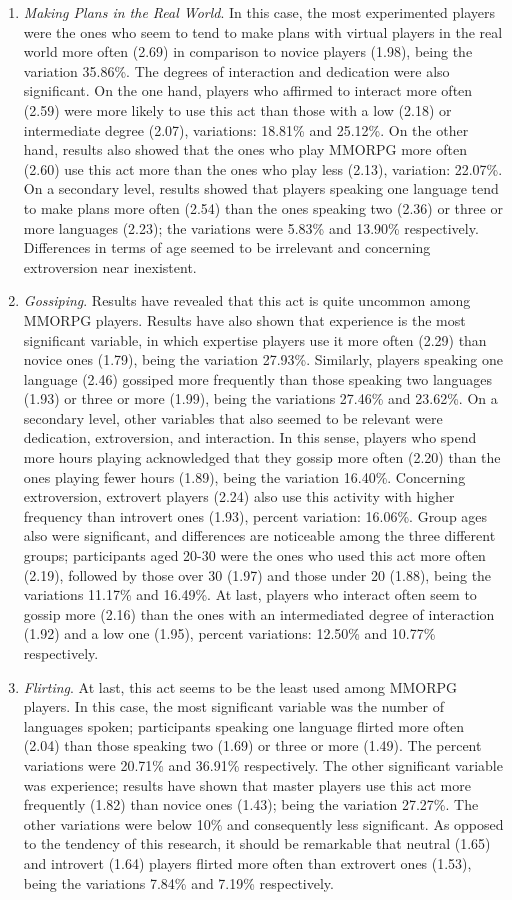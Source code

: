 \documentclass[english]{textolivre}
\begin{document}
\begin{enumerate}
\item \emph{Making Plans in the Real World}. In this case, the most experimented players were the ones who seem to tend to make plans with virtual players in the real world more often (2.69) in comparison to novice players (1.98), being the variation 35.86\%. The degrees of interaction and dedication were also significant. On the one hand, players who affirmed to interact more often (2.59) were more likely to use this act than those with a low (2.18) or intermediate degree (2.07), variations: 18.81\% and 25.12\%. On the other hand, results also showed that the ones who play MMORPG more often (2.60) use this act more than the ones who play less (2.13), variation: 22.07\%. On a secondary level, results showed that players speaking one language tend to make plans more often (2.54) than the ones speaking two (2.36) or three or more languages (2.23); the variations were 5.83\% and 13.90\% respectively. Differences in terms of age seemed to be irrelevant and concerning extroversion near inexistent. 
\item \emph{Gossiping}. Results have revealed that this act is quite uncommon among MMORPG players. Results have also shown that experience is the most significant variable, in which expertise players use it more often (2.29) than novice ones (1.79), being the variation 27.93\%. Similarly, players speaking one language (2.46) gossiped more frequently than those speaking two languages (1.93) or three or more (1.99), being the variations 27.46\% and 23.62\%. On a secondary level, other variables that also seemed to be relevant were dedication, extroversion, and interaction. In this sense, players who spend more hours playing acknowledged that they gossip more often (2.20) than the ones playing fewer hours (1.89), being the variation 16.40\%. Concerning extroversion, extrovert players (2.24) also use this activity with higher frequency than introvert ones (1.93), percent variation: 16.06\%. Group ages also were significant, and differences are noticeable among the three different groups; participants aged 20-30 were the ones who used this act more often (2.19), followed by those over 30 (1.97) and those under 20 (1.88), being the variations 11.17\% and 16.49\%. At last, players who interact often seem to gossip more (2.16) than the ones with an intermediated degree of interaction (1.92) and a low one (1.95), percent variations: 12.50\% and 10.77\% respectively.
\item \emph{Flirting}. At last, this act seems to be the least used among MMORPG players. In this case, the most significant variable was the number of languages spoken; participants speaking one language flirted more often (2.04) than those speaking two (1.69) or three or more (1.49). The percent variations were 20.71\% and 36.91\% respectively. The other significant variable was experience; results have shown that master players use this act more frequently (1.82) than novice ones (1.43); being the variation 27.27\%. The other variations were below 10\% and consequently less significant. As opposed to the tendency of this research, it should be remarkable that neutral (1.65) and introvert (1.64) players flirted more often than extrovert ones (1.53), being the variations 7.84\% and 7.19\% respectively. 

\end{enumerate}
\end{document}
